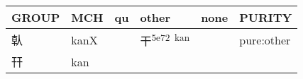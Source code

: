 \documentclass[14pt,a4paper]{scrartcl}
\begin{document}
\begin{longtable}[c]{@{}llllll@{}}
\toprule
\begin{minipage}[b]{0.14\columnwidth}\raggedright\strut
GROUP
\strut\end{minipage} &
\begin{minipage}[b]{0.14\columnwidth}\raggedright\strut
MCH
\strut\end{minipage} &
\begin{minipage}[b]{0.14\columnwidth}\raggedright\strut
qu
\strut\end{minipage} &
\begin{minipage}[b]{0.14\columnwidth}\raggedright\strut
other
\strut\end{minipage} &
\begin{minipage}[b]{0.14\columnwidth}\raggedright\strut
none
\strut\end{minipage} &
\begin{minipage}[b]{0.14\columnwidth}\raggedright\strut
PURITY
\strut\end{minipage}\tabularnewline
\midrule
\endhead
\begin{minipage}[t]{0.14\columnwidth}\raggedright\strut
倝
\strut\end{minipage} &
\begin{minipage}[t]{0.14\columnwidth}\raggedright\strut
kanX
\strut\end{minipage} &
\begin{minipage}[t]{0.14\columnwidth}\raggedright\strut
\strut\end{minipage} &
\begin{minipage}[t]{0.14\columnwidth}\raggedright\strut
干\textsuperscript{5e72~kan}
\strut\end{minipage} &
\begin{minipage}[t]{0.14\columnwidth}\raggedright\strut
\strut\end{minipage} &
\begin{minipage}[t]{0.14\columnwidth}\raggedright\strut
pure:other
\strut\end{minipage}\tabularnewline
\begin{minipage}[t]{0.14\columnwidth}\raggedright\strut
幵
\strut\end{minipage} &
\begin{minipage}[t]{0.14\columnwidth}\raggedright\strut
kan
\strut\end{minipage} &
\begin{minipage}[t]{0.14\columnwidth}\raggedright\strut
\strut\end{minipage} &
\begin{minipage}[t]{0.14\columnwidth}\raggedright\strut

\end{minipage}
\end{longtable}
\end{document}
